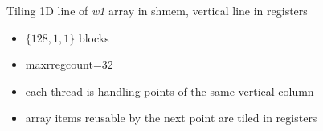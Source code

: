 \documentclass[aspectratio=169]{beamer}
\begin{document}
\begin{frame}[fragile,t]{Tiling 1D line of \emph{w1} array in shmem, vertical line in registers}

\begin{minipage}[t][2.5cm]{\textwidth}
\begin{itemize}
\item $\{128, 1, 1\}$ blocks
\item maxrregcount=32
\item each thread is handling points of the same vertical column
\item array items reusable by the next point are tiled in registers
\end{itemize}
\end{minipage}

%
\end{frame}
\end{document}
